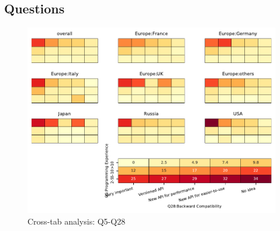 
\subsection{Questions}


\begin{figure}
\begin{center}
\includegraphics[width=12cm]{../pdfs/Q5-Q28.pdf}
\caption{Cross-tab analysis: Q5-Q28}
\label{fig:Q5-Q28}
\end{center}
\end{figure}
